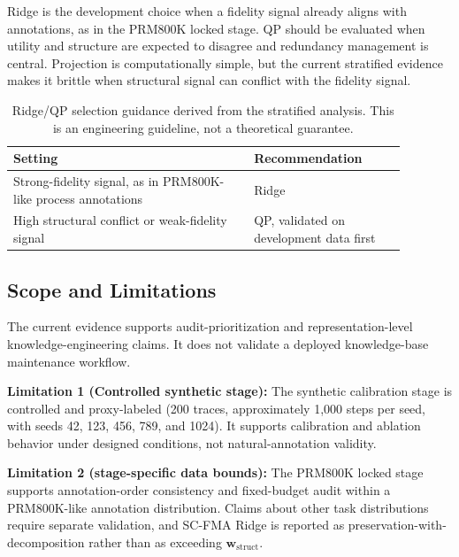 \documentclass[a4paper,fleqn]{cas-sc}
\newcommand{\wstruct}{\ensuremath{\mathbf{w}_{\mathrm{struct}}}}
\begin{document}
Ridge is the development choice when a fidelity signal already aligns with annotations, as in the PRM800K locked stage. QP should be evaluated when utility and structure are expected to disagree and redundancy management is central. Projection is computationally simple, but the current stratified evidence makes it brittle when structural signal can conflict with the fidelity signal.

\begin{table}[ht]
\caption{Ridge/QP selection guidance derived from the stratified analysis. This is an engineering guideline, not a theoretical guarantee.}
\label{tab:variant-policy}
\centering
\small
\renewcommand{\arraystretch}{1.08}
\begin{tabular}{p{0.54\linewidth}p{0.34\linewidth}}
\toprule
\textbf{Setting} & \textbf{Recommendation} \\
\midrule
Strong-fidelity signal, as in PRM800K-like process annotations & Ridge \\
High structural conflict or weak-fidelity signal & QP, validated on development data first \\
\bottomrule
\end{tabular}
\end{table}

\subsection{Scope and Limitations}
\label{sec:scope-limitations}

\medskip
\noindent The current evidence supports audit-prioritization and representation-level knowledge-engineering claims. It does not validate a deployed knowledge-base maintenance workflow.

\medskip
\noindent\textbf{Limitation 1 (Controlled synthetic stage):} The synthetic calibration stage is controlled and proxy-labeled (200 traces, approximately 1,000 steps per seed, with seeds 42, 123, 456, 789, and 1024). It supports calibration and ablation behavior under designed conditions, not natural-annotation validity.

\textbf{Limitation 2 (stage-specific data bounds):} The PRM800K locked stage supports annotation-order consistency and fixed-budget audit within a PRM800K-like annotation distribution. Claims about other task distributions require separate validation, and SC-FMA Ridge is reported as preservation-with-decomposition rather than as exceeding \wstruct{}.
\end{document}
